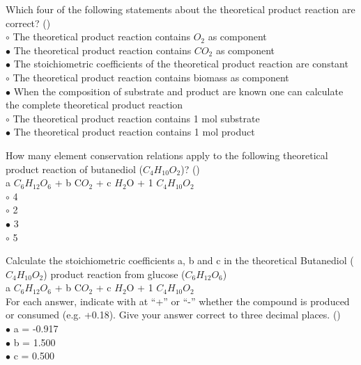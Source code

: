 \documentclass[]{beamer}
\begin{document}
\begin{frame}[shrink] {} 
\color{blue}
  Which four of the following statements about the theoretical product reaction are correct?
 ({\color{green}{Q2}})\\
\color{black}
\setlength{\parindent}{-0.4cm}
{\color{red}$\circ$} The theoretical product reaction contains $O_{2}$ as component  \\
{\color{red}$\bullet$} The theoretical product reaction contains $CO_{2}$ as component  \\
{\color{red}$\bullet$} The stoichiometric coefficients of the theoretical product reaction are constant  \\
{\color{red}$\circ$} The theoretical product reaction contains biomass as component  \\
{\color{red}$\bullet$} When the composition of substrate and product are known one can calculate the complete theoretical product reaction  \\
{\color{red}$\circ$} The theoretical product reaction contains 1 mol substrate  \\
{\color{red}$\bullet$} The theoretical product reaction contains 1 mol product  \\
\end{frame}


\begin{frame}[shrink] {} 
\color{blue}
How many element conservation relations apply to the following theoretical product reaction of butanediol ($C_{4}$$H_{10}$$O_{2}$)? ({\color{green}{Q3a}})\\
\color{gray}
a $C_{6}$$H_{12}$$O_{6}$ + b C$O_{2}$ + c $H_{2}$O + 1 $C_{4}$$H_{10}$$O_{2}$  \\
\color{black}
\setlength{\parindent}{-0.4cm}
{\color{red}$\circ$} 4  \\
{\color{red}$\circ$} 2  \\
{\color{red}$\bullet$} 3  \\
{\color{red}$\circ$} 5  \\
\end{frame}


\begin{frame}[shrink] {} 
\color{blue}
Calculate the stoichiometric coefficients a, b and c in the theoretical Butanediol ($C_{4}$$H_{10}$$O_{2}$) product reaction from glucose ($C_{6}$$H_{12}$$O_{6}$) \\[0.4em]
\color{gray}
a $C_{6}$$H_{12}$$O_{6}$ + b C$O_{2}$ + c $H_{2}$O + 1 $C_{4}$$H_{10}$$O_{2}$ \\[0.4em]
\color{blue}
For each answer, indicate with at “+” or “-” whether the compound is produced or consumed (e.g. +0.18). Give your answer correct to three decimal places. ({\color{green}{Q3b}})\\[1em]
\color{black}
\setlength{\parindent}{-0.4cm}
{\color{red}$\bullet$} a = -0.917\\
{\color{red}$\bullet$} b = 1.500\\
{\color{red}$\bullet$} c = 0.500\\

\end{frame}
\end{document}
